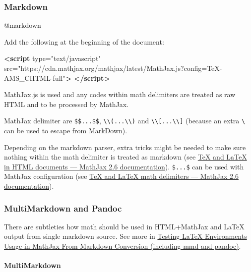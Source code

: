 \documentclass[]{article}
\newenvironment{Shaded}{}{}
\newcommand{\KeywordTok}[1]{\textcolor[rgb]{0.00,0.44,0.13}{\textbf{{#1}}}}
\newcommand{\StringTok}[1]{\textcolor[rgb]{0.25,0.44,0.63}{{#1}}}
\newcommand{\OtherTok}[1]{\textcolor[rgb]{0.00,0.44,0.13}{{#1}}}
\let\oldparagraph\paragraph
\renewcommand{\paragraph}[1]{\oldparagraph{#1}\mbox{}}
\begin{document}
\subsubsection{Markdown}\label{markdown}

@markdown

Add the following at the beginning of the document:

\begin{Shaded}
\begin{Highlighting}[]
\KeywordTok{<script}\OtherTok{ type=}\StringTok{"text/javascript"}
\OtherTok{    src=}\StringTok{"https://cdn.mathjax.org/mathjax/latest/MathJax.js?config=TeX-AMS_CHTML-full"}\KeywordTok{>}
    \KeywordTok{</script>}
\end{Highlighting}
\end{Shaded}

MathJax.js is used and any codes within math delimiters are treated as
raw HTML and to be processed by MathJax.

MathJax delimiter are \texttt{\$\$...\$\$},
\texttt{\textbackslash{}\textbackslash{}(...\textbackslash{}\textbackslash{})}
and
\texttt{\textbackslash{}\textbackslash{}{[}...\textbackslash{}\textbackslash{}{]}}
(because an extra \texttt{\textbackslash{}} can be used to escape from
MarkDown).

Depending on the markdown parser, extra tricks might be needed to make
sure nothing within the math delimiter is treated as markdown (see
\href{http://mathjax.readthedocs.org/en/latest/tex.html\#tex-and-latex-in-html-documents}{TeX
and LaTeX in HTML documents --- MathJax 2.6 documentation}).
\texttt{\$...\$} can be used with MathJax configuration (see
\href{http://mathjax.readthedocs.org/en/latest/tex.html\#tex-and-latex-math-delimiters}{TeX
and LaTeX math delimiters --- MathJax 2.6 documentation}).

\subsubsection{MultiMarkdown and Pandoc}\label{multimarkdown-and-pandoc}

There are subtleties how math should be used in HTML+MathJax and LaTeX
output from single markdown source. See more in
\href{https://github.com/ickc/mathjax-latex-md-mmd-pandoc}{Testing LaTeX
Environments Usage in MathJax From Markdown Conversion (including mmd
and pandoc)}.

\paragraph{MultiMarkdown}\label{multimarkdown-2}
\end{document}
